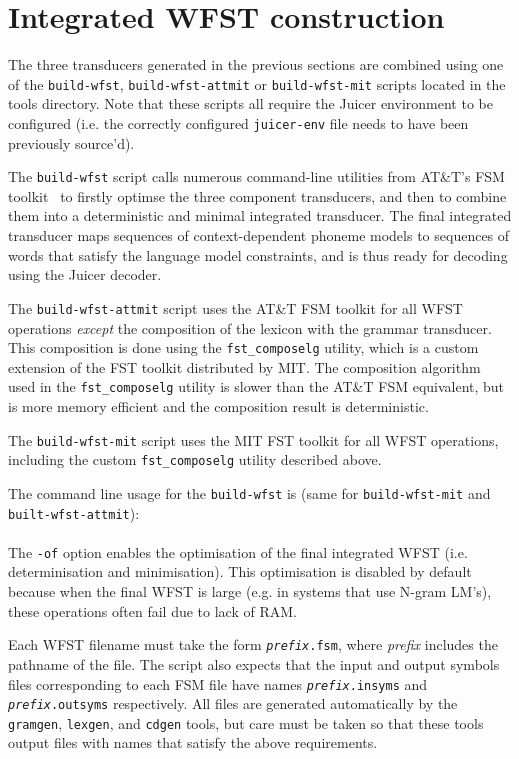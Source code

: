 \documentclass[a4paper,12pt]{report}
\begin{document}
\section{Integrated WFST construction}
\label{sec:intwfst}

The three transducers generated in the previous sections are combined using one of the {\tt build-wfst}, {\tt build-wfst-attmit} or {\tt build-wfst-mit} scripts located in the tools directory. Note that these scripts all require the Juicer environment to be configured (i.e. the correctly configured {\tt juicer-env} file needs to have been previously source'd).

The {\tt build-wfst} script calls numerous command-line utilities from AT\&T's FSM toolkit~\cite{attfsm,mohri00design} to firstly optimse the three component transducers, and then to combine them into a deterministic and minimal integrated transducer. The final integrated transducer maps sequences of context-dependent phoneme models to sequences of words that satisfy the language model constraints, and is thus ready for decoding using the Juicer decoder.

The {\tt build-wfst-attmit} script uses the AT\&T FSM toolkit for all WFST operations \emph{except} the composition of the lexicon with the grammar transducer. This composition is done using the {\tt fst\_composelg} utility, which is a custom extension of the FST toolkit distributed by MIT. The composition algorithm used in the {\tt fst\_composelg} utility is slower than the AT\&T FSM equivalent, but is more memory efficient and the composition result is deterministic.

The {\tt build-wfst-mit} script uses the MIT FST toolkit for all WFST operations, including the custom {\tt fst\_composelg} utility described above.

The command line usage for the {\tt build-wfst} is (same for {\tt build-wfst-mit} and {\tt built-wfst-attmit}):
\\[5mm]
\hspace*{10mm}{\tt build-wfst [-of] <Grammar WFST> <Lexicon WFST> <CD phoneme WFST>}
\\

The {\tt -of} option enables the optimisation of the final integrated WFST (i.e. determinisation and minimisation). This optimisation is disabled by default because when the final WFST is large (e.g. in systems that use N-gram LM's), these operations often fail due to lack of RAM.

Each WFST filename must take the form {\tt \emph{prefix}.fsm}, where \emph{prefix} includes the pathname of the file. The script also expects that the input and output symbols files corresponding to each FSM file have names {\tt \emph{prefix}.insyms} and {\tt \emph{prefix}.outsyms} respectively. All files are generated automatically by the {\tt gramgen}, {\tt lexgen}, and {\tt cdgen} tools, but care must be taken so that these tools output files with names that satisfy the above requirements. 
\end{document}
